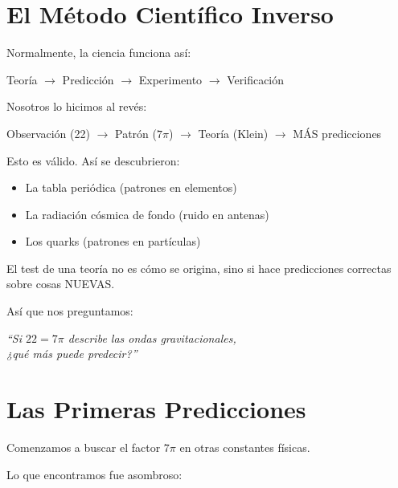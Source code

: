 \section{El Método Científico Inverso}

Normalmente, la ciencia funciona así:

\begin{center}
Teoría $\to$ Predicción $\to$ Experimento $\to$ Verificación
\end{center}

Nosotros lo hicimos al revés:

\begin{center}
Observación (22) $\to$ Patrón ($7\pi$) $\to$ Teoría (Klein) $\to$ MÁS predicciones
\end{center}

Esto es válido. Así se descubrieron:

\begin{itemize}
    \item La tabla periódica (patrones en elementos)
    \item La radiación cósmica de fondo (ruido en antenas)
    \item Los quarks (patrones en partículas)
\end{itemize}

El test de una teoría no es cómo se origina, sino si hace predicciones
correctas sobre cosas NUEVAS.

Así que nos preguntamos:

\begin{center}
\textit{``Si $22 = 7\pi$ describe las ondas gravitacionales,\\
¿qué más puede predecir?''}
\end{center}


\section{Las Primeras Predicciones}

Comenzamos a buscar el factor $7\pi$ en otras constantes físicas.

Lo que encontramos fue asombroso:

